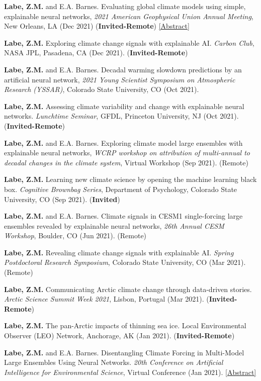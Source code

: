 \documentclass[margin,line,palatino,courier,10pt]{res}
\begin{document}
\begin{resume}
\begin{etaremune}[leftmargin=0in,topsep=0in,parsep=0in]
\item \textbf{Labe, Z.M.} and E.A. Barnes. Evaluating global climate models using simple, explainable neural networks, \textit{2021 American Geophysical Union Annual Meeting}, New Orleans, LA (Dec 2021) (\textbf{Invited-Remote}) \href{https://agu.confex.com/agu/fm21/meetingapp.cgi/Paper/797879}{[Abstract]}
\item \textbf{Labe, Z.M.} Exploring climate change signals with explainable AI. \textit{Carbon Club}, NASA JPL, Pasadena, CA (Dec 2021). (\textbf{Invited-Remote})
\item \textbf{Labe, Z.M.} and E.A. Barnes. Decadal warming slowdown predictions by an artificial neural network, \textit{2021 Young Scientist Symposium on Atmospheric Research (YSSAR)}, Colorado State University, CO (Oct 2021).
\item \textbf{Labe, Z.M.} Assessing climate variability and change with explainable neural networks. \textit{Lunchtime Seminar}, GFDL, Princeton University, NJ (Oct 2021). (\textbf{Invited-Remote})
\item \textbf{Labe, Z.M.} and E.A. Barnes. Exploring climate model large ensembles with explainable neural networks, \textit{WCRP workshop on attribution of multi-annual to decadal changes in the climate system}, Virtual Workshop (Sep 2021). (Remote)
\item \textbf{Labe, Z.M.} Learning new climate science by opening the machine learning black box. \textit{Cognitive Brownbag Series}, Department of Psychology, Colorado State University, CO (Sep 2021). (\textbf{Invited})
\item \textbf{Labe, Z.M.} and E.A. Barnes. Climate signals in CESM1 single-forcing large ensembles revealed by explainable neural networks, \textit{26th Annual CESM Workshop}, Boulder, CO (Jun 2021). (Remote)
\item \textbf{Labe, Z.M.} Revealing climate change signals with explainable AI. \textit{Spring Postdoctoral Research Symposium}, Colorado State University, CO (Mar 2021). (Remote)
\item \textbf{Labe, Z.M.} Communicating Arctic climate change through data-driven stories. \textit{Arctic Science Summit Week 2021}, Lisbon, Portugal (Mar 2021). (\textbf{Invited-Remote})
\item \textbf{Labe, Z.M.} The pan-Arctic impacts of thinning sea ice. Local Environmental Observer (LEO) Network, Anchorage, AK (Jan 2021). (\textbf{Invited-Remote})
\item \textbf{Labe, Z.M.} and E.A. Barnes. Disentangling Climate Forcing in Multi-Model Large Ensembles Using Neural Networks. \textit{20th Conference on Artificial Intelligence for Environmental Science}, Virtual Conference (Jan 2021). \href{https://ams.confex.com/ams/101ANNUAL/meetingapp.cgi/Paper/379553}{[Abstract]}

\end{etaremune}
\end{resume}
\end{document}
